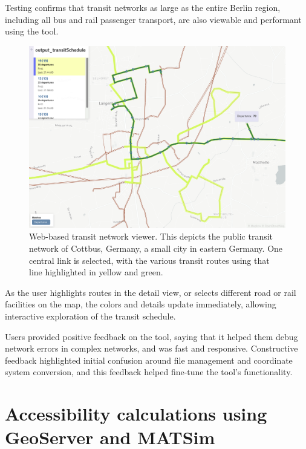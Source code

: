 Testing confirms that transit networks as large as the entire Berlin region, including all bus and rail passenger transport, are also viewable and performant using the tool.

\begin{figure}[!ht]
  \includegraphics[width=\textwidth]{chapters/12-server-experiments/images/transit-viewer.png}
  \caption[Web-based transit network viewer]{Web-based transit network viewer. This depicts the public transit network of Cottbus, Germany, a small city in eastern Germany. One central link is selected, with the various transit routes using that line highlighted in yellow and green.}
  \label{fig:transit-viewer}
\end{figure}

As the user highlights routes in the detail view, or selects different road or rail facilities on the map, the colors and details update immediately, allowing interactive exploration of the transit schedule.

Users provided positive feedback on the tool, saying that it helped them debug network errors in complex networks, and was fast and responsive. Constructive feedback highlighted initial confusion around file management and coordinate system conversion, and this feedback helped fine-tune the tool's functionality.

\hypertarget{server-experiments-geoserver}{%
\section{Accessibility calculations using GeoServer and MATSim}\label{server-experiments-geoserver}}

